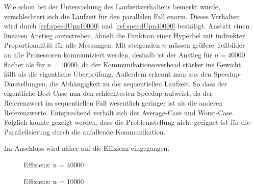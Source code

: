 Wie schon bei der Untersuchung des Laufzeitverhaltens bemerkt wurde, verschlechtert sich die Laufzeit für den parallelen Fall enorm. 
Dieses Verhalten wird durch \autoref{ref:speedUpn10000} und \autoref{ref:speedUpn40000} bestätigt. 
Anstatt einen linearen Anstieg anzustreben, ähnelt die Funktion einer Hyperbel mit indirekter Proportionalität für alle Messungen. 
Mit steigenden $n$ müssen größere Teilbilder an alle Prozessoren kommuniziert werden, deshalb ist der Anstieg für $n=40000$ flacher als für $n=10000$, da der Kommunikationsoverhead stärker ins Gewicht fällt als die eigentliche Überprüfung. 
Außerdem erkennt man aus den Speedup-Darstellungen, die Abhängigkeit zu der sequentiellen Laufzeit. 
So dass der eigentliche Best-Case nun den schlechtesten Speedup aufweist, da der Referenzwert im sequentiellen Fall wesentlich geringer ist als die anderen Referenzwerte. 
Entsprechend verhält sich der Average-Case und Worst-Case. Folglich konnte gezeigt werden, dass die Problemstellung nicht geeignet ist für die Parallelisierung durch die anfallende Kommunikation. 

Im Anschluss wird näher auf die Effizienz eingegangen.
\begin{figure}[!ht]
\begin{minipage}{0.49\textwidth}
	\caption{Effizienz: n = 40000}
	\label{ref:Effizienzn40000}
\end{minipage}
\hfill
\begin{minipage}{0.49\textwidth}
	\caption{Effizienz: n = 10000}
	\label{ref:Effizienzn10000}
\end{minipage}
\end{figure}

